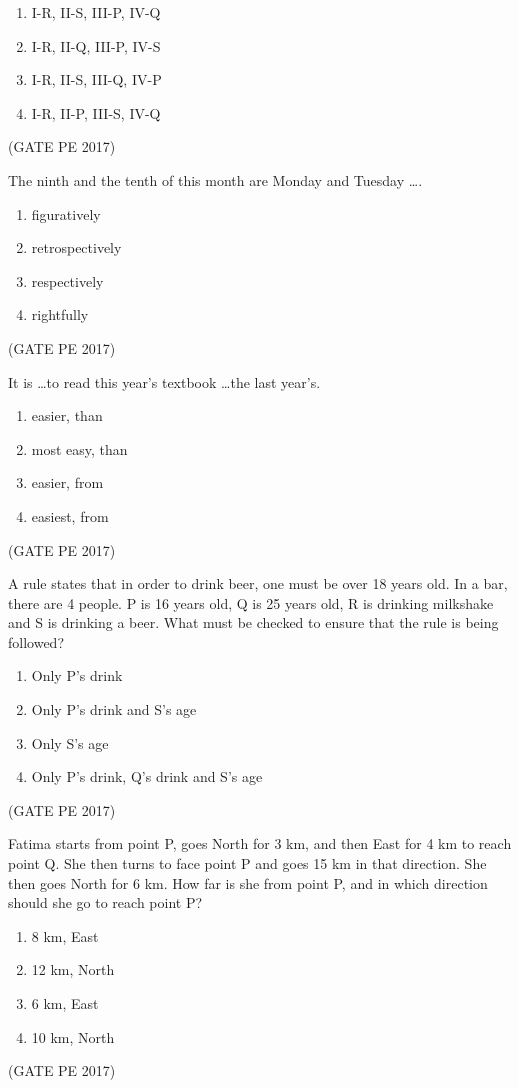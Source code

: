 \documentclass[journal,12pt,onecolumn]{IEEEtran}
\theoremstyle{remark}
\begin{document}
\begin{enumerate}
{\begin{enumerate}
    \item I-R, II-S, III-P, IV-Q
    \item I-R, II-Q, III-P, IV-S
    \item I-R, II-S, III-Q, IV-P
    \item I-R, II-P, III-S, IV-Q
\end{enumerate}
\hfill{(GATE PE 2017)}

\item The ninth and the tenth of this month are Monday and Tuesday \dots.
\begin{enumerate}
\item figuratively
\item retrospectively
\item respectively
\item rightfully
\end{enumerate}
\hfill{(GATE PE 2017)}

\item It is \dots to read this year's textbook \dots the last year's.
\begin{enumerate}
\item easier, than
\item most easy, than
\item easier, from
\item easiest, from
\end{enumerate}
\hfill{(GATE PE 2017)}

\item A rule states that in order to drink beer, one must be over 18 years old. In a bar, there are 4 people. P is 16 years old, Q is 25 years old, R is drinking milkshake and S is drinking a beer. What must be checked to ensure that the rule is being followed?
\begin{enumerate}
\item Only P's drink
\item Only P's drink and S's age
\item Only S's age
\item Only P's drink, Q's drink and S's age
\end{enumerate}
\hfill{(GATE PE 2017)}

\item Fatima starts from point P, goes North for 3 km, and then East for 4 km to reach point Q. She then turns to face point P and goes 15 km in that direction. She then goes North for 6 km. How far is she from point P, and in which direction should she go to reach point P?
\begin{enumerate}
\item 8 km, East
\item 12 km, North
\item 6 km, East
\item 10 km, North
\end{enumerate}
\hfill{(GATE PE 2017)}

}
\end{enumerate}
\end{document}
